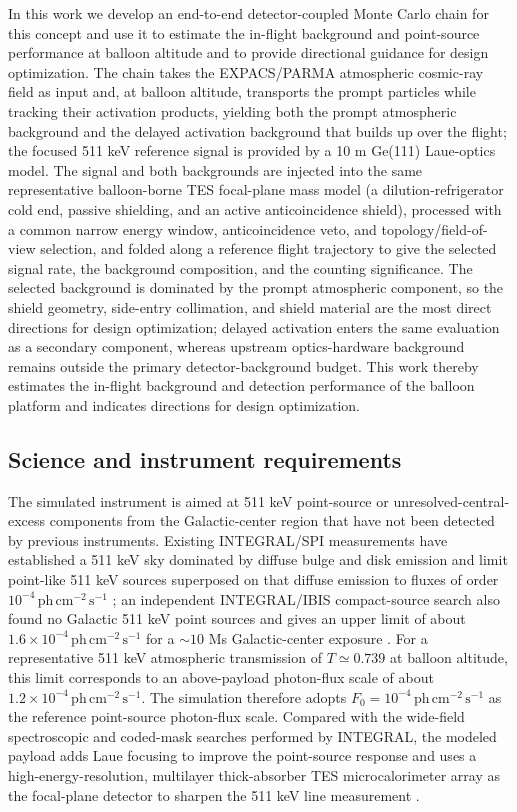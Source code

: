 \documentclass[11pt]{article}
\newcommand{\phcms}{\ensuremath{\,\mathrm{ph\,cm^{-2}\,s^{-1}}}}
\newcommand{\fzero}{F_{0}}
\begin{document}
In this work we develop an end-to-end detector-coupled Monte Carlo chain for this concept and use it to estimate the in-flight background and point-source performance at balloon altitude and to provide directional guidance for design optimization. The chain takes the EXPACS/PARMA atmospheric cosmic-ray field as input and, at balloon altitude, transports the prompt particles while tracking their activation products, yielding both the prompt atmospheric background and the delayed activation background that builds up over the flight; the focused 511 keV reference signal is provided by a 10 m Ge(111) Laue-optics model. The signal and both backgrounds are injected into the same representative balloon-borne TES focal-plane mass model (a dilution-refrigerator cold end, passive shielding, and an active anticoincidence shield), processed with a common narrow energy window, anticoincidence veto, and topology/field-of-view selection, and folded along a reference flight trajectory to give the selected signal rate, the background composition, and the counting significance. The selected background is dominated by the prompt atmospheric component, so the shield geometry, side-entry collimation, and shield material are the most direct directions for design optimization; delayed activation enters the same evaluation as a secondary component, whereas upstream optics-hardware background remains outside the primary detector-background budget. This work thereby estimates the in-flight background and detection performance of the balloon platform and indicates directions for design optimization.

\subsection{Science and instrument requirements}
\label{sec:requirements}

The simulated instrument is aimed at 511 keV point-source or unresolved-central-excess components from the Galactic-center region that have not been detected by previous instruments. Existing INTEGRAL/SPI measurements have established a 511 keV sky dominated by diffuse bulge and disk emission and limit point-like 511 keV sources superposed on that diffuse emission to fluxes of order $10^{-4}\phcms$ \cite{Siegert2016AA,Yoneda2025}; an independent INTEGRAL/IBIS compact-source search also found no Galactic 511 keV point sources and gives an upper limit of about $1.6\times10^{-4}\phcms$ for a $\sim10$ Ms Galactic-center exposure \cite{DeCesare2011}. For a representative 511 keV atmospheric transmission of $T\simeq0.739$ at balloon altitude, this limit corresponds to an above-payload photon-flux scale of about $1.2\times10^{-4}\phcms$. The simulation therefore adopts $\fzero=10^{-4}\phcms$ as the reference point-source photon-flux scale. Compared with the wide-field spectroscopic and coded-mask searches performed by INTEGRAL, the modeled payload adds Laue focusing to improve the point-source response and uses a high-energy-resolution, multilayer thick-absorber TES microcalorimeter array as the focal-plane detector to sharpen the 511 keV line measurement \cite{Shirazi2023,Caputo2017}.
\end{document}
